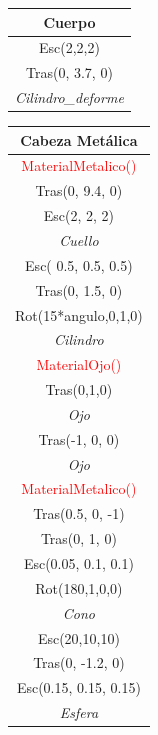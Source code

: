 \documentclass{article}
\begin{document}
\begin{table}[h]
	\centering
	\label{2}
	\begin{tabular}{|c|}
		\hline
		\textbf{Cuerpo}\\ \hline
		Esc(2,2,2)\\ \hline
		Tras(0, 3.7, 0)\\ \hline
		\textit{Cilindro\_deforme}\\ \hline

	\end{tabular}
\end{table}



\begin{table}[h!]
	\centering
	\label{4}
	\begin{tabular}{|c|}
		\hline
		\textbf{Cabeza Metálica}\\ \hline
		\textcolor{red}{MaterialMetalico()}\\ \hline
		Tras(0, 9.4, 0)\\ \hline
		Esc(2, 2, 2)\\ \hline
		\textit{Cuello}\\ \hline
		Esc( 0.5, 0.5, 0.5)\\ \hline
		Tras(0, 1.5, 0)\\ \hline
		Rot(15*angulo,0,1,0)\\ \hline
		\textit{Cilindro}\\ \hline
		\textcolor{red}{MaterialOjo()}\\ \hline
		Tras(0,1,0)\\ \hline
		\textit{Ojo}\\ \hline
		Tras(-1, 0, 0)\\ \hline
		\textit{Ojo}\\ \hline
		\textcolor{red}{MaterialMetalico()}\\ \hline
		Tras(0.5, 0, -1)\\ \hline
		Tras(0, 1, 0)\\ \hline
		Esc(0.05, 0.1, 0.1)\\ \hline
		Rot(180,1,0,0)\\ \hline
		\textit{Cono}\\ \hline
		Esc(20,10,10)\\ \hline
		Tras(0, -1.2, 0)\\ \hline
		Esc(0.15, 0.15, 0.15)\\ \hline
		\textit{Esfera}\\ \hline
	\end{tabular}
\end{table}
\end{document}
